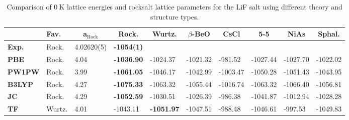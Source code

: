 \documentclass[titlepage,11pt]{article}
\begin{document}
\begin{table}[]
\begin{adjustwidth}{-0.25in}{-0.25in}%
	\begin{tabular}{l|lllllllll}
		{ } & \textbf{Fav.} & \multicolumn{1}{c}{\textbf{a$_{\text{Rock}}$}} & \multicolumn{1}{c}{\textbf{Rock.}} & \multicolumn{1}{c}{\textbf{Wurtz.}} & \multicolumn{1}{c}{\textbf{$\beta$-BeO}} & \multicolumn{1}{c}{\textbf{CsCl}} & \multicolumn{1}{c}{\textbf{5-5}} & \multicolumn{1}{c}{\textbf{NiAs}} & \multicolumn{1}{c}{\textbf{Sphal.}} \\ \hline
		\textbf{Exp.} & Rock. & 4.02620(5) & \textbf{-1054(1)} &  &  &  &  &  &  \\
		\textbf{PBE} & Rock. & 4.04 & \textbf{-1036.90} & -1024.37 & -1021.32 & -981.52 & -1027.44 & -1027.70 & -1022.02\\
		\textbf{PW1PW} & Rock. & 3.99 & \textbf{-1061.05} & -1046.17 & -1042.99 & -1003.47 & -1050.28 & -1051.43 & -1043.95\\
		\textbf{B3LYP} & Rock. & 4.27 & \textbf{-1075.33} & -1063.32 & -1055.44 & -1016.74 & -1063.32 & -1066.40 & -1056.81\\
		\textbf{JC} & Rock. & 4.29 & \textbf{-1052.59} & -1030.51 & -1026.39 & -986.38 & -1041.87 & -1012.94 & -1028.28 \\
		\textbf{TF} & Wurtz. & 4.01 & -1043.11 & \textbf{-1051.97} & -1047.51 & -988.48 & -1046.61 & -997.53 & -1049.83 	
	\end{tabular}
\end{adjustwidth}
	\caption{\label{tab:LiF} Comparison of $\SI{0}{\kelvin}$ lattice energies and rocksalt lattice parameters for the LiF salt using different theory and structure types. }
\end{table}
\end{document}

